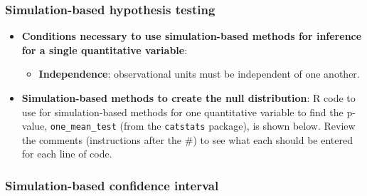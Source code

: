 \documentclass[
]{report}
\newenvironment{Shaded}{\begin{snugshade}}{\end{snugshade}}
\newcommand{\AttributeTok}[1]{\textcolor[rgb]{0.13,0.29,0.53}{#1}}
\newcommand{\CommentTok}[1]{\textcolor[rgb]{0.56,0.35,0.01}{\textit{#1}}}
\newcommand{\DecValTok}[1]{\textcolor[rgb]{0.00,0.00,0.81}{#1}}
\newcommand{\FunctionTok}[1]{\textcolor[rgb]{0.13,0.29,0.53}{\textbf{#1}}}
\newcommand{\NormalTok}[1]{#1}
\newcommand{\SpecialCharTok}[1]{\textcolor[rgb]{0.81,0.36,0.00}{\textbf{#1}}}
\newcommand{\StringTok}[1]{\textcolor[rgb]{0.31,0.60,0.02}{#1}}
\providecommand{\tightlist}{%
  \setlength{\itemsep}{0pt}\setlength{\parskip}{0pt}}
\begin{document}
\subsubsection*{Simulation-based hypothesis testing}\label{simulation-based-hypothesis-testing}

\begin{itemize}
\item
  \textbf{Conditions necessary to use simulation-based methods for inference for a single quantitative variable}:

  \begin{itemize}
  \tightlist
  \item
    \textbf{Independence}: observational units must be independent of one another.
  \end{itemize}
\item
  \textbf{Simulation-based methods to create the null distribution}: R code to use for simulation-based methods for one quantitative variable to find the p-value, \texttt{one\_mean\_test} (from the \texttt{catstats} package), is shown below. Review the comments (instructions after the \#) to see what each should be entered for each line of code.

\begin{Shaded}
\end{Shaded}
\end{itemize}

\subsubsection*{Simulation-based confidence interval}\label{simulation-based-confidence-interval}
\end{document}
